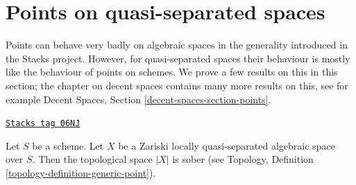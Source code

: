 \section{Points on quasi-separated spaces}
\label{spaces-properties-section-points-quasi-separated}
Points can behave very badly on algebraic spaces in the generality introduced
in the Stacks project. However, for quasi-separated spaces their behaviour
is mostly like the behaviour of points on schemes. We prove a few results
on this in this section; the chapter on decent spaces contains many more
results on this, see for example
Decent Spaces, Section \ref{decent-spaces-section-points}.

\begin{lemma}
\label{spaces-properties-lemma-quasi-separated-sober}
\href{https://stacks.math.columbia.edu/tag/06NJ}{\texttt{Stacks tag 06NJ}}

Let $S$ be a scheme. Let $X$ be a Zariski locally quasi-separated
algebraic space over $S$. Then the topological space $|X|$ is sober (see
Topology, Definition \ref{topology-definition-generic-point}).
\end{lemma}

